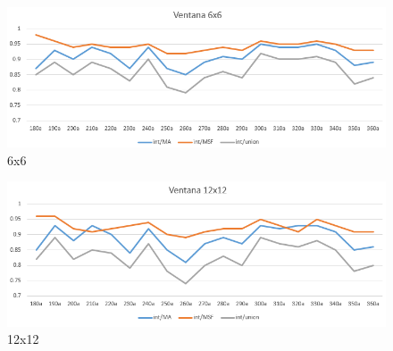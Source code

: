 \begin{figure}[H]
    \includegraphics[width=\textwidth]{Imagenes/filter 6x6.png}
     \hfill
     \caption{6x6}
    \label{filter6x6}
\end{figure}

\begin{figure}[H]
    \includegraphics[width=\textwidth]{Imagenes/filter 12x12.png}
     \hfill
     \caption{12x12}
    \label{filter12x12}
\end{figure}



